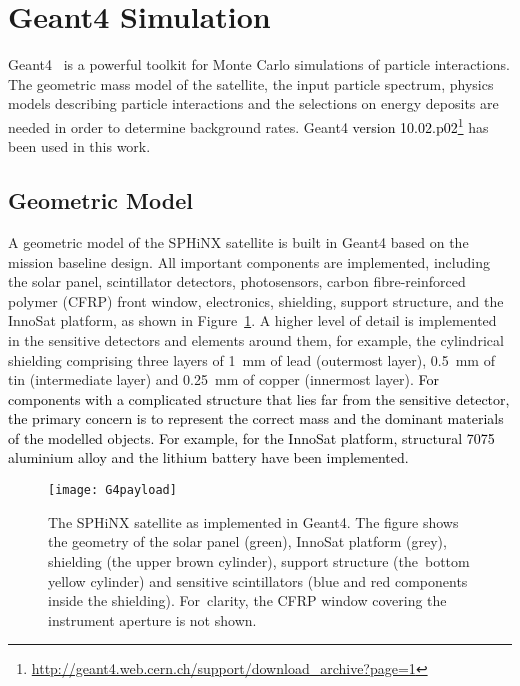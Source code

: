 \documentclass[galaxies,article,accept,moreauthors,pdftex,10pt,a4paper]{mdpi}
\begin{document}
\section{Geant4 Simulation}
\label{sec:g4sim}

Geant4~\cite{ref:geant4} is a powerful toolkit for Monte Carlo simulations of particle interactions.
The geometric mass model of the satellite, the input particle spectrum, physics models describing particle interactions and the selections on energy deposits are needed in order to determine background rates.
Geant4 \textcolor{black}{version 10.02.p02\footnote{\url{http://geant4.web.cern.ch/support/download_archive?page=1}}} has been used in this work.

\subsection{Geometric Model}
A geometric model of the SPHiNX satellite is built in Geant4 based on the mission baseline design. All important components are implemented, including the solar panel, scintillator detectors, photosensors, carbon fibre-reinforced polymer (CFRP) front window, electronics, shielding, support structure, and the InnoSat platform, as shown in Figure~\ref{fig:g4payload}. A higher level of detail is implemented in the sensitive detectors and elements around them, for example, the cylindrical shielding comprising three layers of 1~mm of lead (outermost layer), 0.5~mm of tin (intermediate layer) and 0.25~mm of copper (innermost layer). \textcolor{black}{For components with a complicated structure that lies far from the sensitive detector, the primary concern is to represent the correct mass and the dominant materials of the modelled objects. For example, for the InnoSat platform, structural 7075 aluminium alloy and the lithium battery have been implemented.}

\begin{figure}[H]
\centering
\texttt{[image: G4payload]}
\caption{The SPHiNX satellite as implemented in Geant4. The figure shows the geometry of the solar panel (green), InnoSat platform (grey), shielding (the upper brown cylinder), support structure (the~bottom yellow cylinder) and sensitive scintillators (blue and red components inside the shielding). For~clarity, the CFRP window covering the instrument aperture is not shown.} %
\label{fig:g4payload}
\end{figure}
\end{document}
